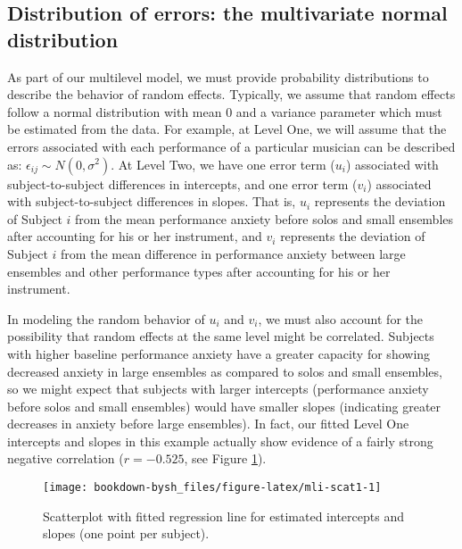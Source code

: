 \documentclass[
]{krantz}
\begin{document}
\hypertarget{MVN}{%
\subsection{Distribution of errors: the multivariate normal distribution}\label{MVN}}

As part of our multilevel model, we must provide probability distributions to describe the behavior of random effects. Typically, we assume that random effects follow a normal distribution with mean 0 and a variance parameter which must be estimated from the data. For example, at Level One, we will assume that the errors associated with each performance of a particular musician can be described as: \(\epsilon_{ij}\sim N(0,\sigma^2)\). At Level Two, we have one error term (\(u_{i}\)) associated with subject-to-subject differences in intercepts, and one error term (\(v_{i}\)) associated with subject-to-subject differences in slopes. That is, \(u_{i}\) represents the deviation of Subject \(i\) from the mean performance anxiety before solos and small ensembles after accounting for his or her instrument, and \(v_{i}\) represents the deviation of Subject \(i\) from the mean difference in performance anxiety between large ensembles and other performance types after accounting for his or her instrument.

In modeling the random behavior of \(u_{i}\) and \(v_{i}\), we must also account for the possibility that random effects at the same level might be correlated. Subjects with higher baseline performance anxiety have a greater capacity for showing decreased anxiety in large ensembles as compared to solos and small ensembles, so we might expect that subjects with larger intercepts (performance anxiety before solos and small ensembles) would have smaller slopes (indicating greater decreases in anxiety before large ensembles). In fact, our fitted Level One intercepts and slopes in this example actually show evidence of a fairly strong negative correlation (\(r=-0.525\), see Figure \ref{fig:mli-scat1}).

\begin{figure}

{\centering \texttt{[image: bookdown-bysh\_files/figure-latex/mli-scat1-1]} 

}

\caption{Scatterplot with fitted regression line for estimated intercepts and slopes (one point per subject).}\label{fig:mli-scat1}
\end{figure}
\end{document}
